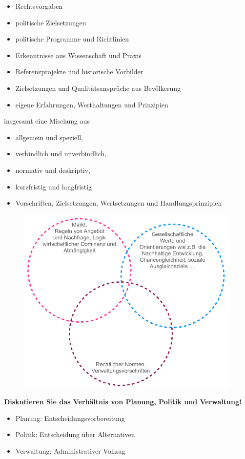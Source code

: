 \documentclass[]{article}
\newenvironment{question}{\vspace{8mm}\noindent\bfseries}{\\}
\begin{document}
\begin{itemize}
	\item Rechtsvorgaben
	\item politische Zielsetzungen
	\item politische Programme und Richtlinien
	\item Erkenntnisse aus Wissenschaft und Praxis
	\item Referenzprojekte und historische Vorbilder
	\item Zielsetzungen und Qualitätsansprüche aus Bevölkerung
	\item eigene Erfahrungen, Werthaltungen und Prinzipien
\end{itemize}

insgesamt eine Mischung aus

\begin{itemize}
	\item allgemein und speziell,
	\item verbindlich und unverbindlich,
	\item normativ und deskriptiv,
	\item kurzfristig und langfristig
	\item Vorschriften, Zielsetzungen, Wertsetzungen und Handlungsprinzipien
\end{itemize}

\begin{figure}[h!]
	\centering
	\includegraphics[width=0.5\linewidth]{images/planung_wirkgeflecht}
	\label{fig:planungwirkgeflecht}
\end{figure}


\begin{question}
	Diskutieren Sie das Verhältnis von Planung, Politik und Verwaltung!
\end{question}
\begin{itemize}
	\item Planung: Entscheidungsvorbereitung
	\item Politik: Entscheidung über Alternativen
	\item Verwaltung: Administrativer Vollzug
\end{itemize}
\end{document}
